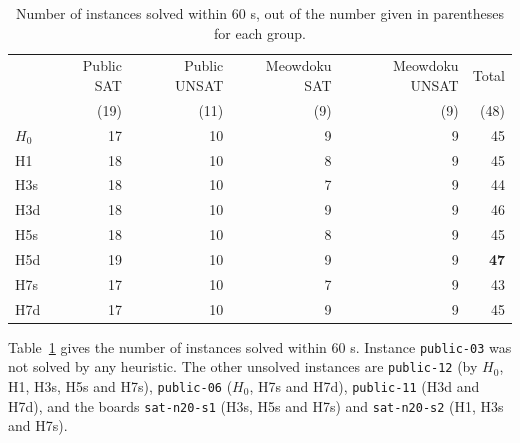\begin{table}[H]
\centering
\begin{tabular}{@{}lrrrrr@{}}
\toprule
 & Public SAT & Public UNSAT & Meowdoku SAT & Meowdoku UNSAT & Total\\
 & (19) & (11) & (9) & (9) & (48)\\
\midrule
$H_0$ & 17 & 10 & 9 & 9 & 45\\
H1 & 18 & 10 & 8 & 9 & 45\\
H3s & 18 & 10 & 7 & 9 & 44\\
H3d & 18 & 10 & 9 & 9 & 46\\
H5s & 18 & 10 & 8 & 9 & 45\\
H5d & 19 & 10 & 9 & 9 & \textbf{47}\\
H7s & 17 & 10 & 7 & 9 & 43\\
H7d & 17 & 10 & 9 & 9 & 45\\
\bottomrule
\end{tabular}
\caption{Number of instances solved within 60 s, out of the number given in parentheses for each group.}
\label{tab:q5-solved}
\end{table}
Table~\ref{tab:q5-solved} gives the number of instances solved within 60 s. Instance \texttt{public-03} was not solved by any heuristic. The other unsolved instances are \texttt{public-12} (by $H_0$, H1, H3s, H5s and H7s), \texttt{public-06} ($H_0$, H7s and H7d), \texttt{public-11} (H3d and H7d), and the boards \texttt{sat-n20-s1} (H3s, H5s and H7s) and \texttt{sat-n20-s2} (H1, H3s and H7s).

